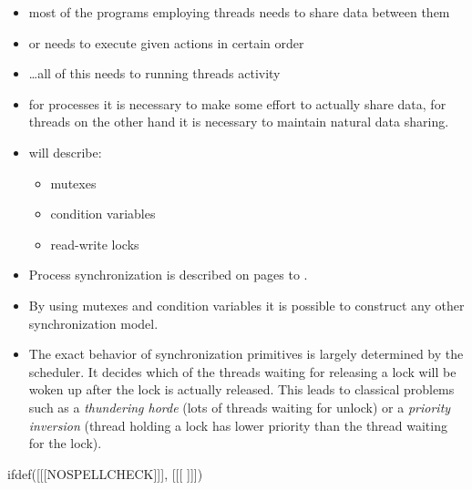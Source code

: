 
\begin{slide}

\begin{itemize}
\item most of the programs employing threads needs to share data between them
\item or needs to execute given actions in certain order
\item \dots{}all of this needs to  running threads activity
\item for processes it is necessary to make some effort to actually share data,
for threads on the other hand it is necessary to maintain natural data sharing.
\item will describe:
\begin{itemize}
\item mutexes
\item condition variables
\item read-write locks
\end{itemize}
\end{itemize}
\end{slide}


\begin{itemize}
\item Process synchronization is described on pages
\pageref{SYNCHRONIZATION} to \pageref{SYNCHRONIZATIONEND}.
\item By using mutexes and condition variables it is possible to construct any
other synchronization model.
\item The exact behavior of synchronization primitives is largely determined by
the scheduler.  It decides which of the threads waiting for releasing a lock
will be woken up after the lock is actually released. This leads to classical
problems such as a \emph{thundering horde} (lots of threads waiting for unlock)
or a \emph{priority inversion} (thread holding a lock has lower priority than
the thread waiting for the lock).
\end{itemize}


ifdef([[[NOSPELLCHECK]]], [[[
]]])

